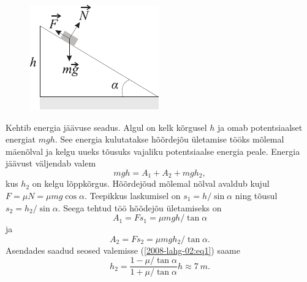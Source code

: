 \solu
\begin{figure}
	\begin{center}
		\vspace{-25pt}
		\includegraphics[width=0.95\linewidth]{2008-lahg-02-lah}
	\end{center}
\end{figure}
Kehtib energia jäävuse seadus. Algul on kelk kõrgusel $h$ ja omab potentsiaalset energiat $mgh$. See energia kulutatakse hõõrdejõu ületamise tööks mõlemal mäenõlval ja kelgu uueks tõusuks vajaliku potentsiaalse energia peale. Energia jäävust väljendab valem 
\begin{equation} \label{2008-lahg-02:eq1}
mgh= A_1+ A_2+ mgh_2,
\end{equation}
kus $h_2$ on kelgu lõppkõrgus. Hõõrdejõud mõlemal nõlval avaldub kujul $F=\mu N=\mu mg \cos\alpha$. Teepikkus laskumisel on $s_1= h/ \sin\alpha$ ning tõusul $s_2= h_2/ \sin\alpha$. Seega tehtud töö hõõdejõu ületamiseks on
\[
A_1= F s_1=\mu mgh/\tan\alpha
\]
ja
\[
A_2= F s_2=\mu mgh_2/\tan\alpha.
\]
Asendades saadud seosed valemisse (\ref{2008-lahg-02:eq1}) saame
\[
h_2= \frac{1 - \mu/\tan\alpha}{1 + \mu/\tan\alpha}h \approx \SI{7}{m}.
\]
\probend